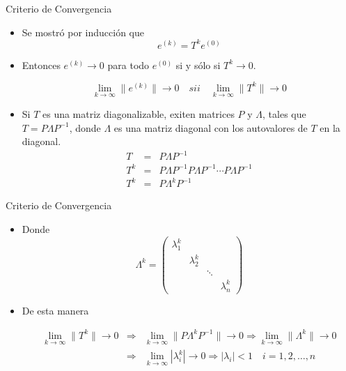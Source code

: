 \documentclass[10pt]{beamer}
\begin{document}
    \begin{frame}{Criterio de Convergencia}
    \begin{itemize}
    \item<1-> Se mostr\'o por inducci\'on que
    $$
    e^{(k)} = T^ke^{(0)}
    $$
    \item<2-> Entonces $e^{(k)} \to 0$ para todo $e^{(0)}$ si y s\'olo si $ T^k \to 0$.
    \begin{block}{}
    $$
     \lim_{k \to \infty}\|e^{(k)} \| \to 0 \quad sii \quad \lim_{k \to \infty}\|T^k\| \to 0
     $$
    \end{block}
    \item<3-> Si $T$ es una matriz diagonalizable, exiten matrices $P$ y $\Lambda$, tales que $T=P\Lambda P^{-1}$, donde $\Lambda$ es una matriz diagonal con los autovalores de $T$ en la diagonal.
    \begin{eqnarray}
     T & = & P \Lambda P^{-1}\nonumber\\
     T^{k} & = & P \Lambda P^{-1}P \Lambda P^{-1}\cdots P \Lambda P^{-1}\nonumber\\
     T^{k} & = & P \Lambda^{k} P^{-1}\nonumber
    \end{eqnarray}
    \end{itemize}
    \end{frame}
    \begin{frame}{Criterio de Convergencia}
    \begin{itemize}
     \item<1-> Donde
     $$
     \Lambda^{k} = \left(\begin{array}{cccc}
                          \lambda_1^{k} & & & \\
                          & \lambda_2^{k} & & \\
                          & & \ddots & \\
                          & & & \lambda_n^{k}
                         \end{array}\right)
     $$
     \item<2-> De esta manera
     \begin{block}{}
     \begin{eqnarray}
        \lim_{k \to \infty}\|T^{k}\| \to 0 & \Rightarrow & \lim_{k \to \infty}\|P \Lambda^{k} P^{-1}\| \to 0 \Rightarrow \lim_{k \to \infty}\|\Lambda^{k}\| \to 0\nonumber\\
         & \Rightarrow & \lim_{k \to \infty}|\lambda_i^{k}| \to 0 \Rightarrow |\lambda_i|<1\quad i=1,2,\ldots,n\nonumber
     \end{eqnarray}
     \end{block}
    \end{itemize}
    \end{frame}
\end{document}
